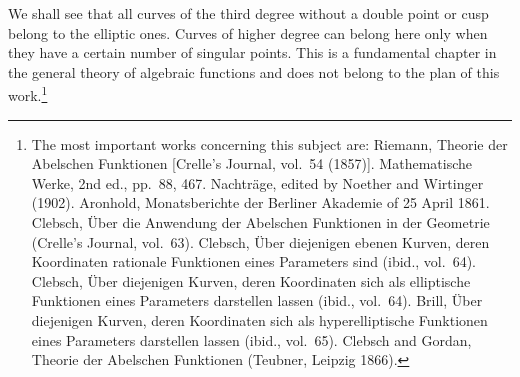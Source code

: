 \documentclass[11pt]{article}
\begin{document}
We shall see that all curves of the third degree without a double point or cusp belong to the elliptic ones. Curves of higher degree can belong here only when they have a certain number of singular points. This is a fundamental chapter in the general theory of algebraic functions and does not belong to the plan of this work.\footnote{The most important works concerning this subject are: Riemann, Theorie der Abelschen Funktionen [Crelle's Journal, vol.~54 (1857)]. Mathematische Werke, 2nd ed., pp.~88, 467. Nachträge, edited by Noether and Wirtinger (1902). Aronhold, Monatsberichte der Berliner Akademie of 25 April 1861. Clebsch, Über die Anwendung der Abelschen Funktionen in der Geometrie (Crelle's Journal, vol.~63). Clebsch, Über diejenigen ebenen Kurven, deren Koordinaten rationale Funktionen eines Parameters sind (ibid., vol.~64). Clebsch, Über diejenigen Kurven, deren Koordinaten sich als elliptische Funktionen eines Parameters darstellen lassen (ibid., vol.~64). Brill, Über diejenigen Kurven, deren Koordinaten sich als hyperelliptische Funktionen eines Parameters darstellen lassen (ibid., vol.~65). Clebsch and Gordan, Theorie der Abelschen Funktionen (Teubner, Leipzig 1866).}
\end{document}
